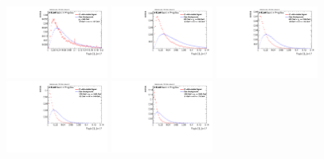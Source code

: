 \begin{figure}
\includegraphics[width=0.3\textwidth]{sascha_input/Appendix/Distributions/higgs/distributions/beta17/h_normal_tj_C2_17_bin1.pdf} \hspace{1mm}
\includegraphics[width=0.3\textwidth]{sascha_input/Appendix/Distributions/higgs/distributions/beta17/h_normal_tj_C2_17_bin2.pdf} \hspace{4mm}
\includegraphics[width=0.3\textwidth]{sascha_input/Appendix/Distributions/higgs/distributions/beta17/h_normal_tj_C2_17_bin3.pdf} 
\bigskip
\includegraphics[width=0.3\textwidth]{sascha_input/Appendix/Distributions/higgs/distributions/beta17/h_normal_tj_C2_17_bin4.pdf} \hspace{4mm}
\includegraphics[width=0.3\textwidth]{sascha_input/Appendix/Distributions/higgs/distributions/beta17/h_normal_tj_C2_17_bin5.pdf} 


\end{figure}
